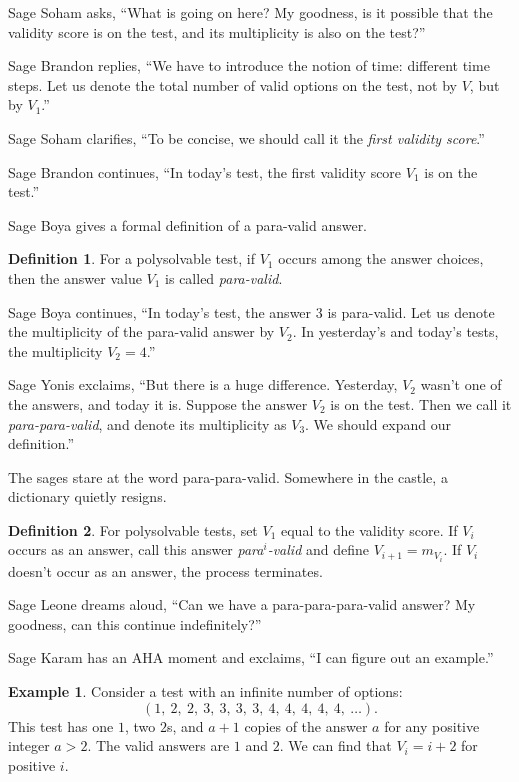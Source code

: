 \documentclass[12pt,reqno]{article}
\theoremstyle{plain}
\theoremstyle{definition}
\newtheorem{definition}{Definition}
\newtheorem{example}{Example}
\theoremstyle{remark}
\begin{document}
Sage Soham asks, ``What is going on here? My goodness, is it possible that the validity score is on the test, and its multiplicity is also on the test?''

Sage Brandon replies, ``We have to introduce the notion of time: different time steps. Let us denote the total number of valid options on the test, not by $V$, but by $V_1$.''

Sage Soham clarifies, ``To be concise, we should call it the \textit{first validity score}.''

Sage Brandon continues, ``In today's test, the first validity score $V_1$ is on the test.''

Sage Boya gives a formal definition of a para-valid answer.

\begin{definition}
For a polysolvable test, if $V_1$ occurs among the answer choices, then the answer value $V_1$ is called \emph{para-valid}.
\end{definition}

Sage Boya continues, ``In today's test, the answer $3$ is para-valid. Let us denote the multiplicity of the para-valid answer by $V_2$. In yesterday's and today's tests, the multiplicity $V_2 = 4$.''

Sage Yonis exclaims, ``But there is a huge difference. Yesterday, $V_2$ wasn't one of the answers, and today it is. Suppose the answer $V_2$ is on the test. Then we call it \textit{para-para-valid}, and denote its multiplicity as $V_3$. We should expand our definition.''

The sages stare at the word para-para-valid. Somewhere in the castle, a dictionary quietly resigns.

\begin{definition}
     For polysolvable tests, set $V_1$ equal to the validity score. If $V_i$ occurs as an answer, call this answer \textit{para$^i$-valid} and define $V_{i+1}=m_{V_i}$. If $V_i$ doesn't occur as an answer, the process terminates.
\end{definition}

Sage Leone dreams aloud, ``Can we have a para-para-para-valid answer? My goodness, can this continue indefinitely?''

Sage Karam has an AHA moment and exclaims, ``I can figure out an example.''

\begin{example}
    Consider a test with an infinite number of options:
    \[(1,\ 2,\ 2,\ 3,\ 3,\ 3,\ 3,\ 4,\ 4,\ 4,\ 4,\ 4,\ \ldots).\]
    This test has one $1$, two $2$s, and $a+1$ copies of the answer $a$ for any positive integer $a > 2$. The valid answers are $1$ and $2$. We can find that $V_i=i+2$ for positive $i$.
\end{example}
\end{document}
